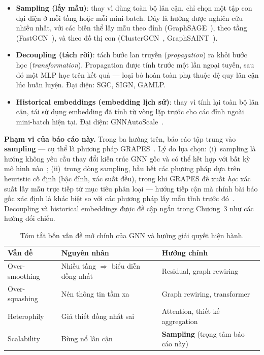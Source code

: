 \begin{itemize}
    \item \textbf{Sampling (lấy mẫu)}: thay vì dùng toàn bộ lân cận, chỉ chọn một tập con đại diện ở mỗi tầng hoặc mỗi mini-batch. Đây là hướng được nghiên cứu nhiều nhất, với các biến thể lấy mẫu theo đỉnh (GraphSAGE~\cite{Hamilton2017}), theo tầng (FastGCN~\cite{ChenFastGCN2018}), và theo đồ thị con (ClusterGCN~\cite{Chiang2019ClusterGCN}, GraphSAINT~\cite{Zeng2020GraphSAINT}).

    \item \textbf{Decoupling (tách rời)}: tách bước lan truyền (\textit{propagation}) ra khỏi bước học (\textit{transformation}). Propagation được tính trước một lần ngoại tuyến, sau đó một MLP học trên kết quả --- loại bỏ hoàn toàn phụ thuộc đệ quy lân cận lúc huấn luyện. Đại diện: SGC, SIGN, GAMLP.

    \item \textbf{Historical embeddings (embedding lịch sử)}: thay vì tính lại toàn bộ lân cận, tái sử dụng embedding đã tính từ vòng lặp trước cho các đỉnh ngoài mini-batch hiện tại. Đại diện: GNNAutoScale~\cite{Fey2021GNNAutoScale}.
\end{itemize}

\textbf{Phạm vi của báo cáo này.} Trong ba hướng trên, báo cáo tập trung vào \textbf{sampling} --- cụ thể là phương pháp GRAPES~\cite{Younesian2023GRAPES}. Lý do lựa chọn: (i)~sampling là hướng không yêu cầu thay đổi kiến trúc GNN gốc và có thể kết hợp với bất kỳ mô hình nào~\cite{Liu2021ScalableSampling, Duan2022LargeScaleBenchmark}; (ii)~trong dòng sampling, hầu hết các phương pháp dựa trên heuristic cố định (bậc đỉnh, xác suất đều), trong khi GRAPES đề xuất \textit{học} xác suất lấy mẫu trực tiếp từ mục tiêu phân loại --- hướng tiếp cận mà chính bài báo gốc xác định là khác biệt so với các phương pháp lấy mẫu tĩnh trước đó~\cite{Younesian2023GRAPES}. Decoupling và historical embeddings được đề cập ngắn trong Chương~3 như các hướng đối chiếu.

\begin{table}[htbp]
\centering
\caption{Tóm tắt bốn vấn đề mở chính của GNN và hướng giải quyết hiện hành.}
\label{tab:gnn-challenges}
\begin{tabular}{lll}
\hline
\textbf{Vấn đề} & \textbf{Nguyên nhân} & \textbf{Hướng chính} \\
\hline
Over-smoothing & Nhiều tầng $\Rightarrow$ biểu diễn đồng nhất & Residual, graph rewiring \\
Over-squashing & Nén thông tin tầm xa & Graph rewiring, transformer \\
Heterophily & Giả thiết đồng nhất sai & Attention, thiết kế aggregation \\
Scalability & Bùng nổ lân cận & \textbf{Sampling} (trọng tâm báo cáo này) \\
\hline
\end{tabular}
\end{table}


